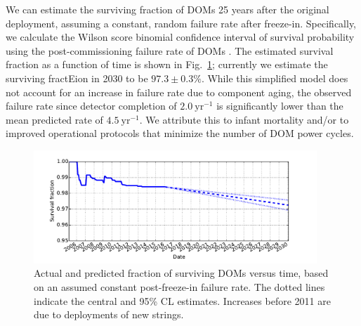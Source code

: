 We can estimate the surviving fraction of DOMs 25 years after the original
deployment, assuming a constant, random failure rate after freeze-in.
Specifically, we calculate the Wilson score binomial confidence interval of
survival probability using the post-commissioning failure rate of DOMs
\cite{Wilson_Score}.  The estimated survival fraction as a function of
time is shown in Fig.~\ref{fig:dom_survival}; currently we estimate the
surviving fractEion in 2030 to be $97.3\pm0.3\%$.  While this simplified
model does not account for an increase in failure rate due to component aging, the
observed failure rate since detector completion of $2.0~\mathrm{yr}^{-1}$ is
significantly lower than the mean predicted rate of $4.5~\mathrm{yr}^{-1}$.  We attribute
this to infant mortality and/or to improved operational protocols that
minimize the number of DOM power cycles.

\begin{figure}[!h]
 \centering
 \includegraphics[width=0.95\textwidth]{graphics/dom/reliability/dom_survival.pdf}
 \caption{Actual and predicted fraction of surviving DOMs versus time, based on an assumed
 constant post-freeze-in failure rate.  The dotted lines indicate the
 central and 95\% CL estimates.  Increases before 2011 are due
 to deployments of new strings.} 
 \label{fig:dom_survival}
\end{figure}

